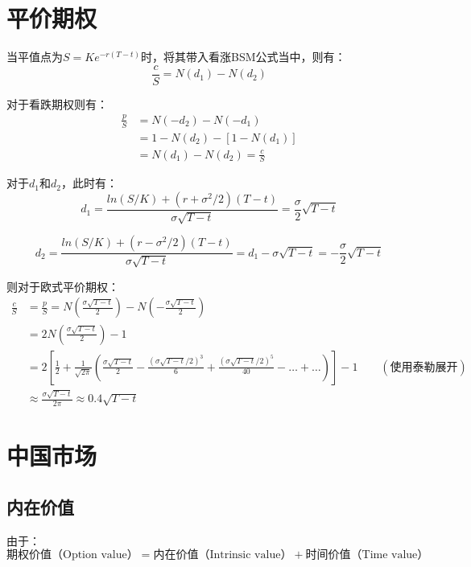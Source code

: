 \documentclass[11pt]{article}
\begin{document}
\section{平价期权}

当平值点为$S = K e^{-r(T-t)}$时，将其带入看涨BSM公式当中，则有：
\begin{equation}
    \frac{c}{S} = N(d_1) - N(d_2)
\end{equation}

对于看跌期权则有：
\begin{align*}
    \frac{p}{S} & = N(-d_2) - N(-d_1) \\
    & = 1 - N(d_2) - [1-N(d_1)] \\
    & = N(d_1) - N(d_2) = \frac{c}{S}
\end{align*}

对于$d_1$和$d_2$，此时有：
\begin{equation}
    d_1 = \frac{ln(S/K)+(r+\sigma^2/2)(T-t)}{\sigma\sqrt{T-t}} = \frac{\sigma}{2}\sqrt{T-t}
\end{equation}

\begin{equation}
    d_2 = \frac{ln(S/K)+(r-\sigma^2/2)(T-t)}{\sigma\sqrt{T-t}} = d_1 - \sigma\sqrt{T-t}= -\frac{\sigma}{2}\sqrt{T-t}
\end{equation}

则对于欧式平价期权：
\begin{align*}
    \frac{c}{S} & = \frac{p}{S} = N \left( \frac{\sigma\sqrt{T-t}}{2} \right) - N\left( -\frac{\sigma\sqrt{T-t}}{2} \right) \\
    & = 2N\left( \frac{\sigma\sqrt{T-t}}{2} \right) - 1 \\
    & = 2\left[\frac{1}{2} + \frac{1}{\sqrt{2\pi}} \left(\frac{\sigma\sqrt{T-t}}{2} - \frac{(\sigma\sqrt{T-t}/2)^3}{6} + \frac{(\sigma\sqrt{T-t}/2)^5}{40} - \dots + \dots\right) \right] - 1 \qquad (\text{使用泰勒展开}) \\
    & \approx \frac{\sigma\sqrt{T-t}}{2\pi} \approx 0.4\sqrt{T-t}
\end{align*}

\section{中国市场}

\subsection{内在价值}

由于：
\begin{equation*}
    \text{期权价值（Option value）} = \text{内在价值（Intrinsic value）} + \text{时间价值（Time value）}
\end{equation*}
\end{document}
